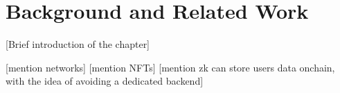 \chapter{Background and Related Work}
 [Brief introduction of the chapter]




[mention networks]
[mention NFTs]
[mention zk can store users data onchain, with the idea of avoiding a dedicated backend]
